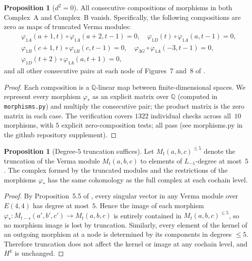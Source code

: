 \documentclass[reqno,10pt]{amsart}
\theoremstyle{definition}
\newtheorem{prop}[subsubsection]{Proposition}
\begin{document}
\begin{prop}[{$d^2=0$}]\label{prop:d2zero}
All consecutive compositions of morphisms in both Complex~A and Complex~B
vanish.  Specifically, the following compositions are zero as maps of
truncated Verma modules:
\begin{align*}
  &\varphi_{1A}(a{+}1,t)\circ\varphi_{1A}(a{+}2,t{-}1)=0,\quad
   \varphi_{1D}(t)\circ\varphi_{1A}(a,t{-}1)=0,\\
  &\varphi_{1B}(c{+}1,t)\circ\varphi_{1B}(c,t{-}1)=0,\quad
   \varphi_{3G}\circ\varphi_{1A}(-3,t{-}1)=0,\\
  &\varphi_{1D}(t{+}2)\circ\varphi_{1A}(a,t{+}1)=0,
\end{align*}
and all other consecutive pairs at each node of Figures~7 and~8 of
\cite{CCK2026}.
\end{prop}

\begin{proof}
Each composition is a $\mathbb{Q}$-linear map between finite-dimensional
spaces.  We represent every morphism $\varphi_*$ as an explicit matrix over
$\mathbb{Q}$ (computed in \texttt{morphisms.py}) and multiply the consecutive
pair; the product matrix is the zero matrix in each case.
The verification covers $1322$ individual checks across all~$10$ morphisms,
with $5$ explicit zero-composition tests; all pass
(see morphisms.py in the github repository supplement).
\end{proof}

\begin{prop}[Degree-$5$ truncation suffices]\label{prop:truncation}
Let $M_t(a,b,c)^{\leq 5}$ denote the truncation of the Verma module
$M_t(a,b,c)$ to elements of $L_{-1}$-degree at most~$5$.  The complex
formed by the truncated modules and the restrictions of the morphisms
$\varphi_*$ has the same cohomology as the full complex at each cochain
level.
\end{prop}

\begin{proof}
By Proposition~5.5 of \cite{CCK2026}, every singular vector in any Verma
module over $E(4,4)$ has degree at most~$5$.  Hence the image of each
morphism $\varphi_*: M_{t-s}(a',b',c')\to M_t(a,b,c)$ is entirely
contained in $M_t(a,b,c)^{\leq 5}$, so no morphism image is lost by
truncation.  Similarly, every element of the kernel of an outgoing
morphism at a node is determined by its components in degrees $\leq 5$.
Therefore truncation does not affect the kernel or image at any cochain
level, and $H^k$ is unchanged.
\end{proof}
\end{document}
